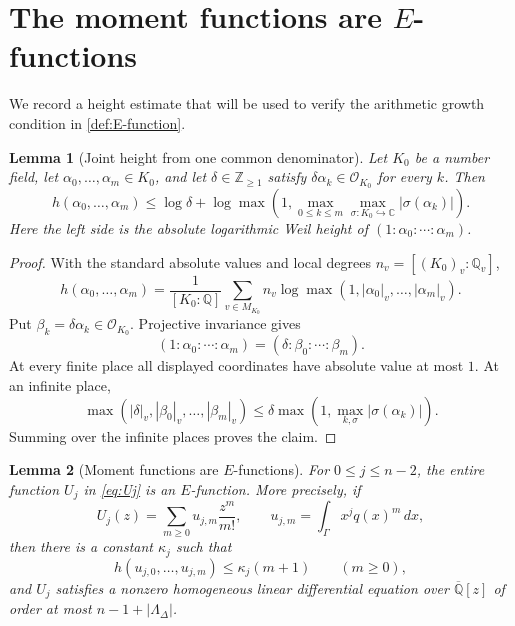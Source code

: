 \documentclass[11pt]{article}
\numberwithin{equation}{section}
\newtheorem{lemma}[lemma]{Lemma}
\theoremstyle{definition}
\theoremstyle{remark}
\newcommand{\C}{\mathbb C}
\newcommand{\Q}{\mathbb Q}
\newcommand{\Qbar}{\overline{\mathbb Q}}
\begin{document}
\section{The moment functions are \texorpdfstring{$E$}{E}-functions}
\label{sec:moment-E-functions}

We record a height estimate that will be used to verify the arithmetic growth
condition in \cref{def:E-function}.

\begin{lemma}[Joint height from one common denominator]
\label{lem:joint-height}
Let $K_0$ be a number field, let $\alpha_0,\ldots,\alpha_m\in K_0$, and let
$\delta\in\mathbb Z_{\ge1}$ satisfy
$\delta\alpha_k\in\mathcal O_{K_0}$ for every $k$.  Then
\[
  h(\alpha_0,\ldots,\alpha_m)
  \le \log\delta
  +\log\max\left(
     1,\max_{0\le k\le m}\max_{\sigma:K_0\hookrightarrow\C}
     |\sigma(\alpha_k)|
   \right).
\]
Here the left side is the absolute logarithmic Weil height of
$(1:\alpha_0:\cdots:\alpha_m)$.
\end{lemma}

\begin{proof}
With the standard absolute values and local degrees
$n_v=[(K_0)_v:\Q_v]$,
\[
  h(\alpha_0,\ldots,\alpha_m)
  =\frac1{[K_0:\Q]}\sum_{v\in M_{K_0}}n_v
   \log\max(1,|\alpha_0|_v,\ldots,|\alpha_m|_v).
\]
Put $\beta_k=\delta\alpha_k\in\mathcal O_{K_0}$.  Projective invariance gives
\[
  (1:\alpha_0:\cdots:\alpha_m)
  =(\delta:\beta_0:\cdots:\beta_m).
\]
At every finite place all displayed coordinates have absolute value at most
$1$.  At an infinite place,
\[
  \max(|\delta|_v,|\beta_0|_v,\ldots,|\beta_m|_v)
  \le \delta\max\left(
     1,\max_{k,\sigma}|\sigma(\alpha_k)|
  \right).
\]
Summing over the infinite places proves the claim.
\end{proof}

\begin{lemma}[Moment functions are $E$-functions]\label{lem:moment-E-functions}
For $0\le j\le n-2$, the entire function $U_j$ in \eqref{eq:Uj} is an
$E$-function.  More precisely, if
\begin{equation}\label{eq:Uj-series}
  U_j(z)=\sum_{m\ge0}u_{j,m}\frac{z^m}{m!},
  \qquad
  u_{j,m}=\int_\Gamma x^j q(x)^m\,dx,
\end{equation}
then there is a constant $\kappa_j$ such that
\[
  h(u_{j,0},\ldots,u_{j,m})\le\kappa_j(m+1)
  \qquad(m\ge0),
\]
and $U_j$ satisfies a nonzero homogeneous linear differential equation over
$\Qbar[z]$ of order at most $n-1+|\Lambda_\Delta|$.
\end{lemma}
\end{document}
